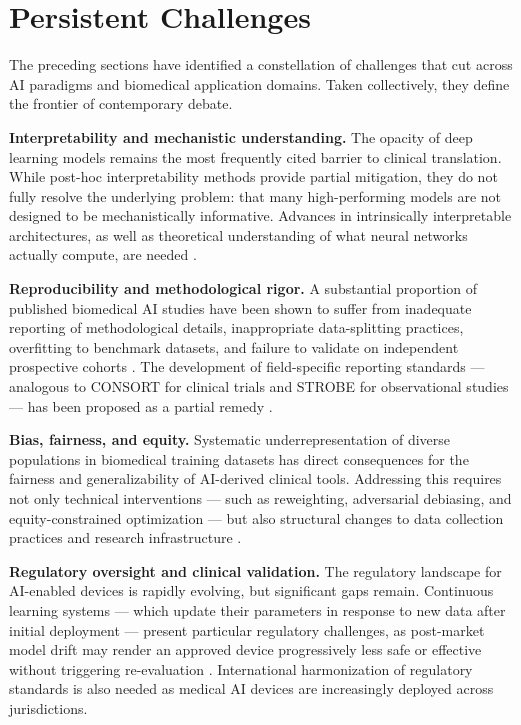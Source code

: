 \section{Persistent Challenges}

The preceding sections have identified a constellation of challenges that cut across AI paradigms and biomedical application domains. Taken collectively, they define the frontier of contemporary debate.

\textbf{Interpretability and mechanistic understanding.} The opacity of deep learning models remains the most frequently cited barrier to clinical translation. While post-hoc interpretability methods provide partial mitigation, they do not fully resolve the underlying problem: that many high-performing models are not designed to be mechanistically informative. Advances in intrinsically interpretable architectures, as well as theoretical understanding of what neural networks actually compute, are needed \parencite{rudin2019}.

\textbf{Reproducibility and methodological rigor.} A substantial proportion of published biomedical AI studies have been shown to suffer from inadequate reporting of methodological details, inappropriate data-splitting practices, overfitting to benchmark datasets, and failure to validate on independent prospective cohorts \parencite{kapoor2023, wynants2020}. The development of field-specific reporting standards --- analogous to CONSORT for clinical trials and STROBE for observational studies --- has been proposed as a partial remedy \parencite{mongan2020}.

\textbf{Bias, fairness, and equity.} Systematic underrepresentation of diverse populations in biomedical training datasets has direct consequences for the fairness and generalizability of AI-derived clinical tools. Addressing this requires not only technical interventions --- such as reweighting, adversarial debiasing, and equity-constrained optimization --- but also structural changes to data collection practices and research infrastructure \parencite{obermeyer2019}.

\textbf{Regulatory oversight and clinical validation.} The regulatory landscape for AI-enabled devices is rapidly evolving, but significant gaps remain. Continuous learning systems --- which update their parameters in response to new data after initial deployment --- present particular regulatory challenges, as post-market model drift may render an approved device progressively less safe or effective without triggering re-evaluation \parencite{fda2023}. International harmonization of regulatory standards is also needed as medical AI devices are increasingly deployed across jurisdictions.


